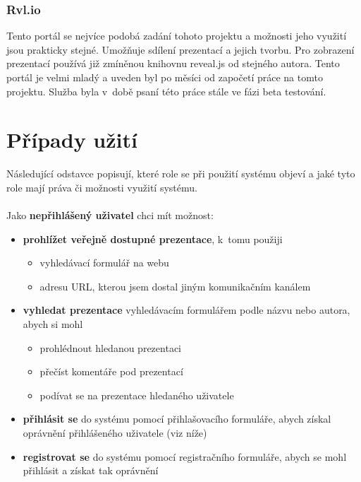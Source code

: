 \documentclass[11pt,twoside,a4paper]{book}
\begin{document}
\subsection{Rvl.io}
Tento portál se nejvíce podobá zadání tohoto projektu a možnosti jeho využití jsou prakticky stejné. Umožňuje sdílení prezentací a jejich tvorbu. Pro zobrazení prezentací používá již zmíněnou knihovnu reveal.js od stejného autora. Tento portál je velmi mladý a uveden byl po měsíci od započetí práce na tomto projektu. Služba byla v~době psaní této práce stále ve fázi beta testování.


\chapter{Případy užití}
Následující odstavce popisují, které role se při použití systému objeví a jaké tyto role mají práva či možnosti využití systému.\\\\

\noindent Jako \textbf{nepřihlášený uživatel} chci mít možnost:
\begin{itemize}
	\item \textbf{prohlížet veřejně dostupné prezentace}, k~tomu použiji 
		\begin{itemize}
			\item vyhledávací formulář na webu
			\item adresu URL, kterou jsem dostal jiným komunikačním kanálem
		\end{itemize}
	\item \textbf{vyhledat prezentace} vyhledávacím formulářem podle názvu nebo autora, abych si mohl
		\begin{itemize}
			\item prohlédnout hledanou prezentaci
			\item přečíst komentáře pod prezentací
			\item podívat se na prezentace hledaného uživatele
		\end{itemize}
	\item \textbf{přihlásit se} do systému pomocí přihlašovacího formuláře, abych získal oprávnění přihlášeného uživatele (viz níže)
	\item \textbf{registrovat se} do systému pomocí registračního formuláře, abych se mohl přihlásit a získat tak oprávnění
\end{itemize}
\end{document}
